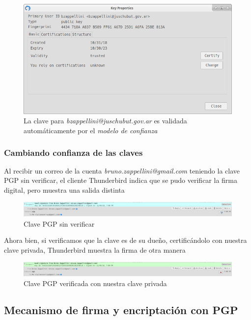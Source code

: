 \begin{figure}[H]
    \centering
    \includegraphics[width=0.8\linewidth]{images/arys-tp3-clave-pgp-juschubut-zape-confiada.png}
    \caption*{La clave para \emph{bzappellini@juschubut.gov.ar} es validada automáticamente por el \emph{modelo de confianza}}
\end{figure}

\subsubsection{Cambiando confianza de las claves}

Al recibir un correo de la cuenta \emph{bruno.zappellini@gmail.com} teniendo la clave PGP sin verificar, el cliente Thunderbird indica que se pudo verificar la firma digital, pero muestra una salida distinta

\begin{figure}[H]
    \centering
    \includegraphics[width=\linewidth]{images/arys-tp3-clave-pgp-sin-verificar.png}
    \caption*{Clave PGP sin verificar}
\end{figure}

Ahora bien, si verificamos que la clave es de su dueño, certificándolo con nuestra clave privada, Thunderbird muestra la firma de otra manera

\begin{figure}[H]
    \centering
    \includegraphics[width=\linewidth]{images/arys-tp3-clave-pgp-verificada.png}
    \caption*{Clave PGP verificada con nuestra clave privada}
\end{figure}

\subsection{Mecanismo de firma y encriptación con PGP}


